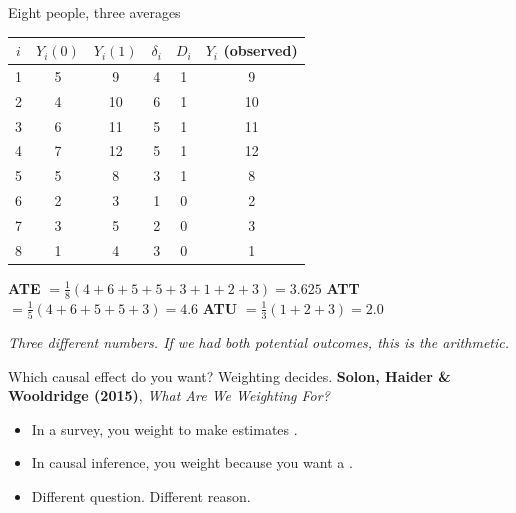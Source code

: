 \documentclass[aspectratio=169,11pt]{beamer}
\begin{document}
\begin{frame}{Eight people, three averages}
\vspace{0.3em}
\begin{center}
\footnotesize
\renewcommand{\arraystretch}{1.1}
\begin{tabular}{@{}c c c c c c@{}}
\toprule
$i$ & $Y_i(0)$ & $Y_i(1)$ & $\delta_i$ & $D_i$ & $Y_i$ (observed) \\
\midrule
\rowcolor{remixgreenlight}1 & 5 & 9  & 4 & 1 & 9 \\
\rowcolor{remixgreenlight}2 & 4 & 10 & 6 & 1 & 10 \\
\rowcolor{remixgreenlight}3 & 6 & 11 & 5 & 1 & 11 \\
\rowcolor{remixgreenlight}4 & 7 & 12 & 5 & 1 & 12 \\
\rowcolor{remixgreenlight}5 & 5 & 8  & 3 & 1 & 8 \\
\midrule
6 & 2 & 3  & 1 & 0 & 2 \\
7 & 3 & 5  & 2 & 0 & 3 \\
8 & 1 & 4  & 3 & 0 & 1 \\
\bottomrule
\end{tabular}
\end{center}
\vspace{0.3em}
\begin{center}
\footnotesize
\textbf{ATE} $= \tfrac{1}{8}(4{+}6{+}5{+}5{+}3{+}1{+}2{+}3) = \mathbf{3.625}$ \quad
\textbf{ATT} $= \tfrac{1}{5}(4{+}6{+}5{+}5{+}3) = \mathbf{4.6}$ \quad
\textbf{ATU} $= \tfrac{1}{3}(1{+}2{+}3) = \mathbf{2.0}$
\end{center}
\vspace{0.1em}
\begin{center}
\footnotesize\color{warmgray}\itshape Three different numbers. If we had both potential outcomes, this is the arithmetic.
\end{center}
\end{frame}

\begin{frame}{Which causal effect do you want? Weighting decides.}
\vspace{0.5em}
\textbf{Solon, Haider \& Wooldridge (2015)}, \textit{What Are We Weighting For?}
\vspace{0.6em}
\begin{itemize}
  \item In a survey, you weight to make estimates .
  \item In causal inference, you weight because you want a .
  \item Different question. Different reason.
\end{itemize}
\vspace{0.6em}
\end{frame}
\end{document}
